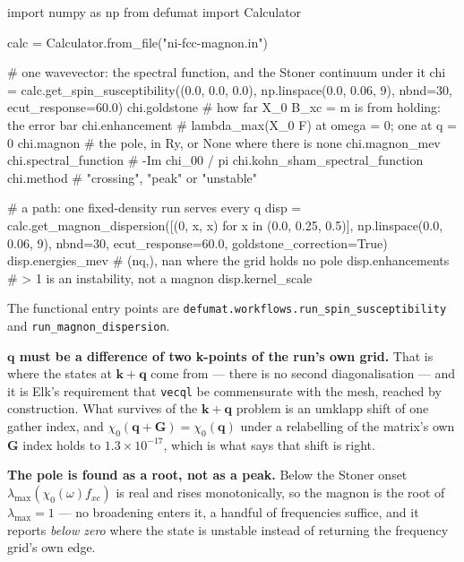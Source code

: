 \documentclass[11pt,a4paper]{article}
\newcommand{\code}[1]{\texttt{\small #1}}
\begin{document}
\begin{pycode}
import numpy as np
from defumat import Calculator

calc = Calculator.from_file("ni-fcc-magnon.in")

# one wavevector: the spectral function, and the Stoner continuum under it
chi = calc.get_spin_susceptibility((0.0, 0.0, 0.0), np.linspace(0.0, 0.06, 9),
                                   nbnd=30, ecut_response=60.0)
chi.goldstone              # how far X_0 B_xc = m is from holding: the error bar
chi.enhancement            # lambda_max(X_0 F) at omega = 0; one at q = 0
chi.magnon                 # the pole, in Ry, or None where there is none
chi.magnon_mev
chi.spectral_function      # -Im chi_00 / pi
chi.kohn_sham_spectral_function
chi.method                 # "crossing", "peak" or "unstable"

# a path: one fixed-density run serves every q
disp = calc.get_magnon_dispersion([(0, x, x) for x in (0.0, 0.25, 0.5)],
                                  np.linspace(0.0, 0.06, 9),
                                  nbnd=30, ecut_response=60.0,
                                  goldstone_correction=True)
disp.energies_mev          # (nq,), nan where the grid holds no pole
disp.enhancements          # > 1 is an instability, not a magnon
disp.kernel_scale
\end{pycode}

The functional entry points are
\code{defumat.workflows.run\_spin\_susceptibility} and
\code{run\_magnon\_dispersion}.

\textbf{$\mathbf q$ must be a difference of two k-points of the run's own
grid.} That is where the states at $\mathbf k+\mathbf q$ come from --- there is
no second diagonalisation --- and it is Elk's requirement that \code{vecql} be
commensurate with the mesh, reached by construction. What survives of the
$\mathbf k+\mathbf q$ problem is an umklapp shift of one gather index, and
$\chi_0(\mathbf q + \mathbf G) = \chi_0(\mathbf q)$ under a relabelling of the
matrix's own $\mathbf G$ index holds to $1.3\times10^{-17}$, which is what says
that shift is right.

\textbf{The pole is found as a root, not as a peak.} Below the Stoner onset
$\lambda_{\max}(\chi_0(\omega) f_{xc})$ is real and rises monotonically, so the
magnon is the root of $\lambda_{\max} = 1$ --- no broadening enters it, a
handful of frequencies suffice, and it reports \emph{below zero} where the
state is unstable instead of returning the frequency grid's own edge.
\end{document}
